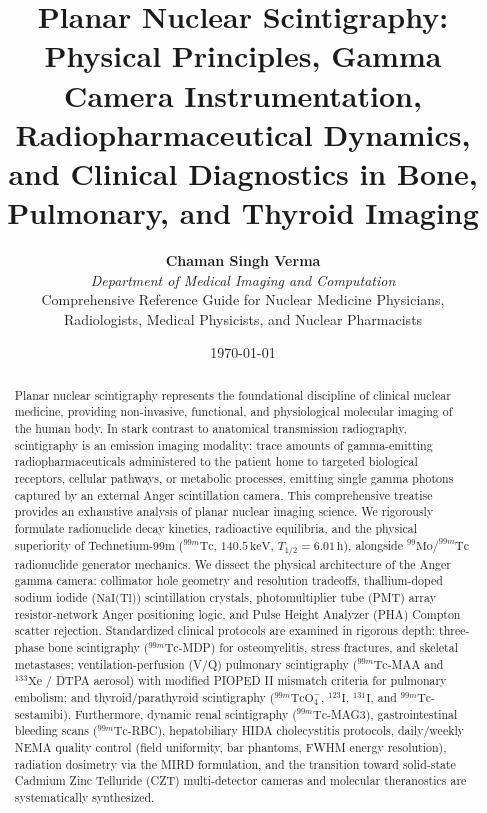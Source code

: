 \documentclass[11pt,a4paper]{article}
\title{\textbf{\huge Planar Nuclear Scintigraphy:}\\[0.4em]
\Large Physical Principles, Gamma Camera Instrumentation, Radiopharmaceutical Dynamics, and Clinical Diagnostics in Bone, Pulmonary, and Thyroid Imaging}
\author{\textbf{Chaman Singh Verma} \\
\textit{Department of Medical Imaging and Computation} \\
\small \textsf{Comprehensive Reference Guide for Nuclear Medicine Physicians,}\\[0.2em]
\small \textsf{Radiologists, Medical Physicists, and Nuclear Pharmacists}}
\date{\today}
\begin{document}
\maketitle

\begin{abstract}
Planar nuclear scintigraphy represents the foundational discipline of clinical nuclear medicine, providing non-invasive, functional, and physiological molecular imaging of the human body. In stark contrast to anatomical transmission radiography, scintigraphy is an emission imaging modality: trace amounts of gamma-emitting radiopharmaceuticals administered to the patient home to targeted biological receptors, cellular pathways, or metabolic processes, emitting single gamma photons captured by an external Anger scintillation camera. This comprehensive treatise provides an exhaustive analysis of planar nuclear imaging science. We rigorously formulate radionuclide decay kinetics, radioactive equilibria, and the physical superiority of Technetium-99m ($^{99m}\text{Tc}$, $140.5\,\text{keV}$, $T_{1/2} = 6.01\,\text{h}$), alongside $^{99}\text{Mo}/^{99m}\text{Tc}$ radionuclide generator mechanics. We dissect the physical architecture of the Anger gamma camera: collimator hole geometry and resolution tradeoffs, thallium-doped sodium iodide ($\text{NaI(Tl)}$) scintillation crystals, photomultiplier tube (PMT) array resistor-network Anger positioning logic, and Pulse Height Analyzer (PHA) Compton scatter rejection. Standardized clinical protocols are examined in rigorous depth: three-phase bone scintigraphy ($^{99m}\text{Tc}$-MDP) for osteomyelitis, stress fractures, and skeletal metastases; ventilation-perfusion (V/Q) pulmonary scintigraphy ($^{99m}\text{Tc}$-MAA and $^{133}\text{Xe}$ / DTPA aerosol) with modified PIOPED II mismatch criteria for pulmonary embolism; and thyroid/parathyroid scintigraphy ($^{99m}\text{Tc}\text{O}_4^-$, $^{123}\text{I}$, $^{131}\text{I}$, and $^{99m}\text{Tc}$-sestamibi). Furthermore, dynamic renal scintigraphy ($^{99m}\text{Tc}$-MAG3), gastrointestinal bleeding scans ($^{99m}\text{Tc}$-RBC), hepatobiliary HIDA cholecystitis protocols, daily/weekly NEMA quality control (field uniformity, bar phantoms, FWHM energy resolution), radiation dosimetry via the MIRD formulation, and the transition toward solid-state Cadmium Zinc Telluride (CZT) multi-detector cameras and molecular theranostics are systematically synthesized.
\end{abstract}

\tableofcontents
\newpage
\end{document}

